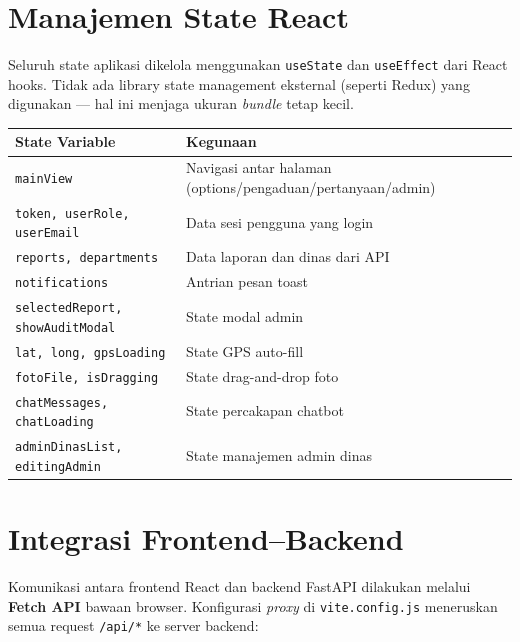\documentclass[12pt,a4paper]{article}
\begin{document}
\section{Manajemen State React}

Seluruh state aplikasi dikelola menggunakan \texttt{useState} dan \texttt{useEffect}
dari React hooks. Tidak ada library state management eksternal (seperti Redux)
yang digunakan --- hal ini menjaga ukuran \textit{bundle} tetap kecil.

\begin{center}
\begin{longtable}{p{4.5cm}p{7cm}}
  \toprule
  \textbf{State Variable} & \textbf{Kegunaan} \\
  \midrule
  \texttt{mainView} & Navigasi antar halaman (options/pengaduan/pertanyaan/admin) \\
  \texttt{token, userRole, userEmail} & Data sesi pengguna yang login \\
  \texttt{reports, departments} & Data laporan dan dinas dari API \\
  \texttt{notifications} & Antrian pesan toast \\
  \texttt{selectedReport, showAuditModal} & State modal admin \\
  \texttt{lat, long, gpsLoading} & State GPS auto-fill \\
  \texttt{fotoFile, isDragging} & State drag-and-drop foto \\
  \texttt{chatMessages, chatLoading} & State percakapan chatbot \\
  \texttt{adminDinasList, editingAdmin} & State manajemen admin dinas \\
  \bottomrule
\end{longtable}
\end{center}

\section{Integrasi Frontend--Backend}

Komunikasi antara frontend React dan backend FastAPI dilakukan melalui
\textbf{Fetch API} bawaan browser. Konfigurasi \textit{proxy} di \texttt{vite.config.js}
meneruskan semua request \texttt{/api/*} ke server backend:
\end{document}
